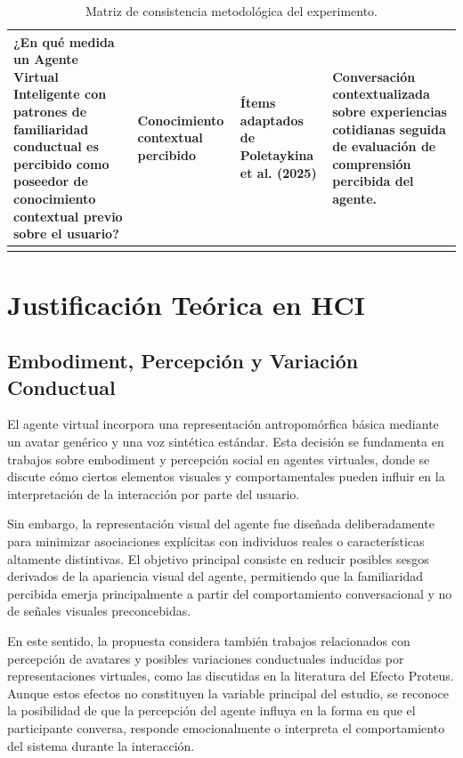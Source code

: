 \documentclass[12pt]{article}
\begin{document}
{\begin{longtable}{|
>{\raggedright\arraybackslash}p{4.5cm}|
>{\raggedright\arraybackslash}p{3cm}|
>{\raggedright\arraybackslash}p{3cm}|
>{\raggedright\arraybackslash}p{4cm}|}
¿En qué medida un Agente Virtual Inteligente con patrones de familiaridad conductual es percibido como poseedor de conocimiento contextual previo sobre el usuario? &
Conocimiento contextual percibido &
Ítems adaptados de Poletaykina et al. (2025) \cite{poletaykina_knowing_2025} &
Conversación contextualizada sobre experiencias cotidianas seguida de evaluación de comprensión percibida del agente. \\
\hline

\caption{Matriz de consistencia metodológica del experimento.}
\label{tab:matriz-consistencia}

\end{longtable}
}








\section{Justificación Teórica en HCI}

\subsection{Embodiment, Percepción y Variación Conductual}

El agente virtual incorpora una representación antropomórfica básica mediante un avatar genérico y una voz sintética estándar. Esta decisión se fundamenta en trabajos sobre embodiment y percepción social en agentes virtuales, donde se discute cómo ciertos elementos visuales y comportamentales pueden influir en la interpretación de la interacción por parte del usuario.

Sin embargo, la representación visual del agente fue diseñada deliberadamente para minimizar asociaciones explícitas con individuos reales o características altamente distintivas. El objetivo principal consiste en reducir posibles sesgos derivados de la apariencia visual del agente, permitiendo que la familiaridad percibida emerja principalmente a partir del comportamiento conversacional y no de señales visuales preconcebidas.

En este sentido, la propuesta considera también trabajos relacionados con percepción de avatares y posibles variaciones conductuales inducidas por representaciones virtuales, como las discutidas en la literatura del Efecto Proteus. Aunque estos efectos no constituyen la variable principal del estudio, se reconoce la posibilidad de que la percepción del agente influya en la forma en que el participante conversa, responde emocionalmente o interpreta el comportamiento del sistema durante la interacción.
\end{document}
